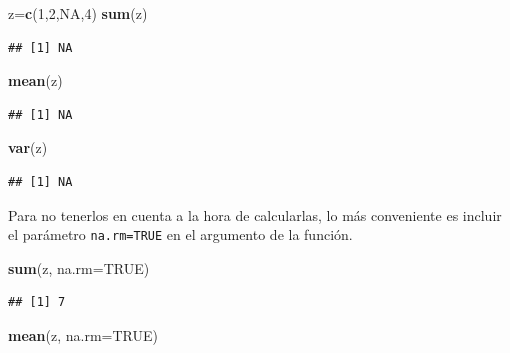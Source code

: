 \documentclass[]{book}
\newenvironment{Shaded}{\begin{snugshade}}{\end{snugshade}}
\newcommand{\DataTypeTok}[1]{\textcolor[rgb]{0.13,0.29,0.53}{#1}}
\newcommand{\DecValTok}[1]{\textcolor[rgb]{0.00,0.00,0.81}{#1}}
\newcommand{\KeywordTok}[1]{\textcolor[rgb]{0.13,0.29,0.53}{\textbf{#1}}}
\newcommand{\NormalTok}[1]{#1}
\newcommand{\OtherTok}[1]{\textcolor[rgb]{0.56,0.35,0.01}{#1}}
\theoremstyle{definition}
\theoremstyle{definition}
\theoremstyle{definition}
\theoremstyle{remark}
\begin{document}
\begin{Shaded}
\begin{Highlighting}[]
\NormalTok{z=}\KeywordTok{c}\NormalTok{(}\DecValTok{1}\NormalTok{,}\DecValTok{2}\NormalTok{,}\OtherTok{NA}\NormalTok{,}\DecValTok{4}\NormalTok{)}
\KeywordTok{sum}\NormalTok{(z)}
\end{Highlighting}
\end{Shaded}

\begin{verbatim}
## [1] NA
\end{verbatim}

\begin{Shaded}
\begin{Highlighting}[]
\KeywordTok{mean}\NormalTok{(z)}
\end{Highlighting}
\end{Shaded}

\begin{verbatim}
## [1] NA
\end{verbatim}

\begin{Shaded}
\begin{Highlighting}[]
\KeywordTok{var}\NormalTok{(z)}
\end{Highlighting}
\end{Shaded}

\begin{verbatim}
## [1] NA
\end{verbatim}

Para no tenerlos en cuenta a la hora de calcularlas, lo más conveniente es incluir el parámetro \texttt{na.rm=TRUE} en el argumento de la función.

\begin{Shaded}
\begin{Highlighting}[]
\KeywordTok{sum}\NormalTok{(z, }\DataTypeTok{na.rm=}\OtherTok{TRUE}\NormalTok{)}
\end{Highlighting}
\end{Shaded}

\begin{verbatim}
## [1] 7
\end{verbatim}

\begin{Shaded}
\begin{Highlighting}[]
\KeywordTok{mean}\NormalTok{(z, }\DataTypeTok{na.rm=}\OtherTok{TRUE}\NormalTok{)}
\end{Highlighting}
\end{Shaded}
\end{document}
